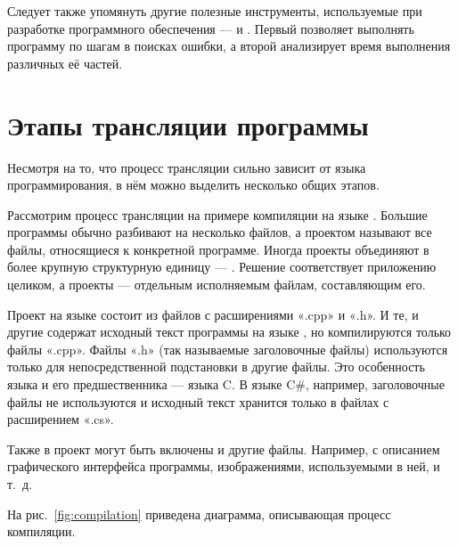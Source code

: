 Следует также упомянуть другие полезные инструменты, используемые при
разработке программного обеспечения —  и
. Первый позволяет выполнять
программу по шагам в поисках ошибки, а второй анализирует время
выполнения различных её частей.

\section{Этапы трансляции программы}

Несмотря на то, что процесс трансляции сильно зависит от языка
программирования, в нём можно выделить несколько общих этапов.

Рассмотрим процесс трансляции на примере компиляции
 на языке \CPP. Большие программы обычно
разбивают на несколько файлов, а проектом называют все файлы,
относящиеся к конкретной программе.  Иногда проекты объединяют в более
крупную структурную единицу — .  Решение
соответствует приложению целиком, а проекты — отдельным исполняемым
файлам, составляющим его.

Проект на языке \CPP состоит из файлов с расширениями «.cpp» и «.h».  И
те, и другие содержат исходный текст программы на языке \CPP, но
компилируются только файлы «.cpp». Файлы «.h» (так называемые
заголовочные файлы) используются только для непосредственной
подстановки в другие файлы. Это особенность языка \CPP и его
предшественника — языка C.  В языке C\#, например, заголовочные файлы
не используются и исходный текст хранится только в файлах с
расширением «.cs».

Также в проект могут быть включены и другие файлы. Например, с
описанием графического интерфейса программы, изображениями,
используемыми в ней, и т.~д.

На рис.~\ref{fig:compilation} приведена диаграмма, описывающая процесс
компиляции.

